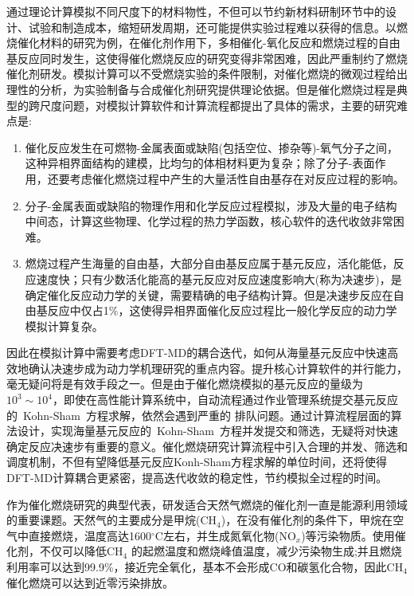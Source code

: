 通过理论计算模拟不同尺度下的材料物性，不但可以节约新材料研制环节中的设计、试验和制造成本，缩短研发周期，还可能提供实验过程难以获得的信息。以燃烧催化材料的研究为例，在催化剂作用下，多相催化-氧化反应和燃烧过程的自由基反应同时发生，\cite{ACSSym-Seri12-495_1992}这使得催化燃烧反应的研究变得非常困难，因此严重制约了燃烧催化剂研发。模拟计算可以不受燃烧实验的条件限制，对催化燃烧的微观过程给出理性的分析，为实验制备与合成催化剂研究提供理论依据。\cite{PCC118-1999_2014,Nat-Commun8-14621_2017,CES56-2659_2001}但是催化燃烧过程是典型的跨尺度问题，对模拟计算软件和计算流程都提出了具体的需求，主要的研究难点是:
\begin{enumerate}
	\item 催化反应发生在可燃物-金属表面或缺陷(包括空位、掺杂等)-氧气分子之间，这种异相界面结构的建模，比均匀的体相材料更为复杂；除了分子-表面作用，还要考虑催化燃烧过程中产生的大量活性自由基存在对反应过程的影响。
	\item 分子-金属表面或缺陷的物理作用和化学反应过程模拟，涉及大量的电子结构中间态，计算这些物理、化学过程的热力学函数，核心软件的迭代收敛非常困难。
	\item 燃烧过程产生海量的自由基，大部分自由基反应属于基元反应，活化能低，反应速度快；只有少数活化能高的基元反应对反应速度影响大(称为决速步)，是确定催化反应动力学的关键，需要精确的电子结构计算。但是决速步反应在自由基反应中仅占1\%，这使得异相界面催化反应过程比一般化学反应的动力学模拟计算复杂。
\end{enumerate}
因此在模拟计算中需要考虑\textrm{DFT-MD}的耦合迭代，如何从海量基元反应中快速高效地确认决速步成为动力学机理研究的重点内容。提升核心计算软件的并行能力，毫无疑问将是有效手段之一。但是由于催化燃烧模拟的基元反应的量级为$10^3\sim10^4$，即使在高性能计算系统中，自动流程通过作业管理系统提交基元反应的~\textrm{Kohn-Sham}~方程求解，依然会遇到严重的 排队问题。通过计算流程层面的算法设计，实现海量基元反应的~\textrm{Kohn-Sham}~方程并发提交和筛选，无疑将对快速确定反应决速步有重要的意义。催化燃烧研究计算流程中引入合理的并发、筛选和调度机制，不但有望降低基元反应Konh-Sham方程求解的单位时间，还将使得DFT-MD计算耦合更紧密，提高迭代收敛的稳定性，节约模拟全过程的时间。

作为催化燃烧研究的典型代表，研发适合天然气燃烧的催化剂一直是能源利用领域的重要课题。\cite{GasHeat22-12_2002,GasHeat22-523_2002,GasHeat21-61_2001}天然气的主要成分是甲烷($\mathrm{CH}_4$)，在没有催化剂的条件下，甲烷在空气中直接燃烧，温度高达1600$^{\circ}\mathrm{C}$左右，并生成氮氧化物($\mathrm{NO}_x$)等污染物质。使用催化剂，不仅可以降低$\mathrm{CH}_4$ 的起燃温度和燃烧峰值温度，减少污染物生成;并且燃烧利用率可以达到99.9\%，接近完全氧化，基本不会形成\textrm{CO}和碳氢化合物，因此$\mathrm{CH}_4$ 催化燃烧可以达到近零污染排放。


